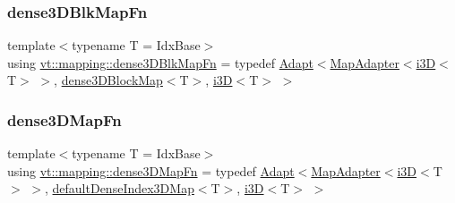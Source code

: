 \subsubsection{\texorpdfstring{dense3\+D\+Blk\+Map\+Fn}{dense3DBlkMapFn}}
{\footnotesize\ttfamily template$<$typename T  = Idx\+Base$>$ \\
using \hyperlink{namespacevt_1_1mapping_a20b151291c38fe5008608b65f28759ac}{vt\+::mapping\+::dense3\+D\+Blk\+Map\+Fn} = typedef \hyperlink{namespacevt_1_1mapping_aafe187035ce8df02f31983e37cdb6a5d}{Adapt}$<$\hyperlink{namespacevt_1_1mapping_a41b113c28bb6430fbcb5be66e08ccf9f}{Map\+Adapter}$<$\hyperlink{namespacevt_1_1mapping_af435b967b9ed1ccb5ec4effdbd9abd13}{i3D}$<$T$>$ $>$, \hyperlink{namespacevt_1_1mapping_a91764d84e5e6d8253872740cb8424726}{dense3\+D\+Block\+Map}$<$T$>$, \hyperlink{namespacevt_1_1mapping_af435b967b9ed1ccb5ec4effdbd9abd13}{i3D}$<$T$>$ $>$}

\mbox{\label{namespacevt_1_1mapping_a4161eb1a3c61249a269654c4529788e0}} 
\subsubsection{\texorpdfstring{dense3\+D\+Map\+Fn}{dense3DMapFn}}
{\footnotesize\ttfamily template$<$typename T  = Idx\+Base$>$ \\
using \hyperlink{namespacevt_1_1mapping_a4161eb1a3c61249a269654c4529788e0}{vt\+::mapping\+::dense3\+D\+Map\+Fn} = typedef \hyperlink{namespacevt_1_1mapping_aafe187035ce8df02f31983e37cdb6a5d}{Adapt}$<$\hyperlink{namespacevt_1_1mapping_a41b113c28bb6430fbcb5be66e08ccf9f}{Map\+Adapter}$<$\hyperlink{namespacevt_1_1mapping_af435b967b9ed1ccb5ec4effdbd9abd13}{i3D}$<$T$>$ $>$, \hyperlink{namespacevt_1_1mapping_a776a69138a1fbceab5bbf10b9c07a858}{default\+Dense\+Index3\+D\+Map}$<$T$>$, \hyperlink{namespacevt_1_1mapping_af435b967b9ed1ccb5ec4effdbd9abd13}{i3D}$<$T$>$ $>$}

\mbox{\label{namespacevt_1_1mapping_adb1f9b4ca3e67e3b47ca1a562f656217}} 
